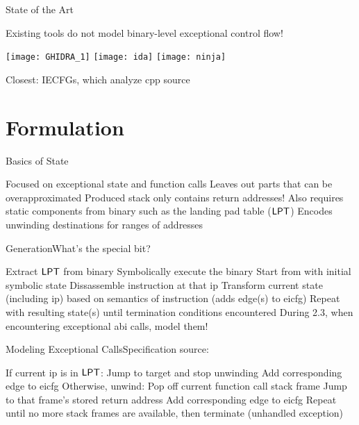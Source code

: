 \begin{frame}{State of the Art}
  \begin{outline}
    \1 Existing tools do not model binary-level exceptional control flow!
    \begin{center}
      \texttt{[image: GHIDRA\_1]}
      \hspace{1cm}
      \texttt{[image: ida]}
      \hspace{1cm}
      \texttt{[image: ninja]}
    \end{center}
    \1 Closest: IECFGs, which analyze \gls{cpp} source
  \end{outline}
\end{frame}

\section{Formulation}
\begin{frame}{Basics of State}
  \begin{outline}
    \1 Focused on \alert{exceptional state} and \alert{function calls}
    \1 Leaves out parts that can be overapproximated
      \2 Produced stack only contains return addresses!
    \1 Also requires static components from binary such as the \alert{landing pad table ($\operatorname{\mathsf{LPT}}$)}
      \2 Encodes unwinding destinations for ranges of addresses
  \end{outline}
\end{frame}

\begin{frame}{Generation}{What's the special bit?}
  \begin{outline}[enumerate]
    \1<+-> Extract $\operatorname{\mathsf{LPT}}$ from binary
    \1<+-> \alert{Symbolically execute} the binary
      \2<+-> Start from  with initial \alert{symbolic state}
      \2<+-> Dissassemble instruction at that \gls{ip}
      \2<+-> Transform current state (including \gls{ip}) based on semantics of instruction (adds edge(s) to \gls{eicfg})
      \2<+-> Repeat with resulting state(s) until termination conditions encountered
    \1<+-> \alert{During 2.3, when encountering exceptional \gls{abi} calls, model them!}
  \end{outline}
\end{frame}

\begin{frame}{Modeling Exceptional  Calls}{Specification source: }
  \begin{block}{}
    \begin{outline}[enumerate]
      \1<+-> If current \gls{ip} is in $\operatorname{\mathsf{LPT}}$:
        \2<+-> Jump to target and stop unwinding
        \2<+-> Add corresponding edge to \gls{eicfg}
      \1<+-> Otherwise, unwind:
        \2<+-> Pop off current function call stack frame
        \2<+-> Jump to that frame's stored return address
        \2<+-> Add corresponding edge to \gls{eicfg}
      \1<+-> Repeat until no more stack frames are available, then terminate (\alert{unhandled exception})
    \end{outline}
  \end{block}
\end{frame}

